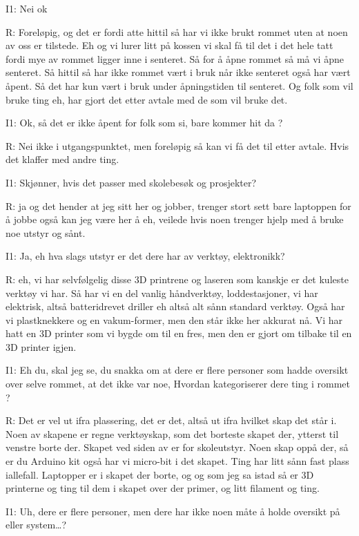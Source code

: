 I1: Nei ok

R: Foreløpig, og det er fordi atte hittil så har vi ikke brukt rommet uten at noen av oss er tilstede. Eh og vi lurer litt på kossen vi skal få til det i det hele tatt fordi mye av rommet ligger inne i senteret. Så for å åpne rommet så må vi åpne senteret. Så hittil så har ikke rommet vært i bruk når ikke senteret også har vært åpent. Så det har kun vært i bruk under åpningstiden til senteret. Og folk som vil bruke ting eh, har gjort det etter avtale med de som vil bruke det.

I1: Ok, så  det er ikke åpent for folk som si, bare kommer hit da ?

R: Nei ikke i utgangspunktet, men foreløpig så kan vi få det til etter avtale. Hvis det klaffer med andre ting.

I1: Skjønner, hvis det passer med skolebesøk og prosjekter?

R: ja og det hender at jeg sitt her og jobber, trenger stort sett bare laptoppen for å jobbe også kan jeg være her å eh, veilede hvis noen trenger hjelp med å bruke noe utstyr og sånt.

I1: Ja, eh hva slags utstyr er det dere har av verktøy, elektronikk?

R: eh, vi har selvfølgelig disse 3D printrene og laseren som kanskje er det kuleste verktøy vi har. Så har vi en del vanlig håndverktøy, loddestasjoner, vi har elektrisk, altså batteridrevet driller eh altså alt sånn standard verktøy. Også har vi plastknekkere og en  vakum-former, men den står ikke her akkurat nå. 
Vi har hatt en 3D printer som vi bygde om til en fres,  men den er gjort om tilbake til en 3D printer igjen.

I1: Eh du, skal jeg se,  du snakka om at dere er flere personer som  hadde oversikt over selve rommet, at det ikke var noe, Hvordan kategoriserer dere ting i rommet ?

R: Det er vel ut ifra plassering, det er det, altså ut ifra hvilket skap det står i. Noen av skapene er regne verktøyskap, som det borteste skapet der, ytterst til venstre borte der. Skapet ved siden av er for skoleutstyr. Noen skap oppå der, så er du Arduino kit også har vi micro-bit i det skapet. Ting har litt sånn fast plass iallefall. Laptopper er i skapet der borte, og og som jeg sa istad  så er 3D printerne og ting til dem i skapet over der primer, og litt filament og ting.

I1:   Uh, dere er flere personer, men dere har ikke  noen måte å holde oversikt på eller system…?

